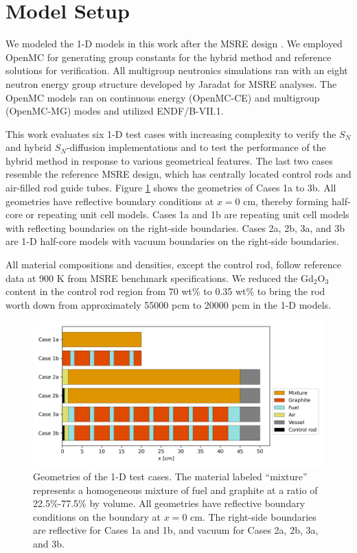 \documentclass[letterpaper]{mc2025}
\begin{document}
\section{Model Setup}

We modeled the 1-D models in this work after the \gls*{MSRE} design \cite{robertson_msre_1965}. We
employed OpenMC \cite{romano_openmc:_2015} for generating group constants
for the hybrid method and reference solutions for verification. All multigroup
neutronics simulations ran with an eight neutron energy group structure developed by Jaradat
\cite{jaradat_development_2021-1} for \gls*{MSRE} analyses. The OpenMC models ran on continuous
energy (OpenMC-CE) and multigroup (OpenMC-MG) modes and utilized ENDF/B-VII.1.

This work evaluates six 1-D test cases with increasing complexity to verify the $S_N$ and hybrid
$S_N$-diffusion implementations and to test the performance of the hybrid
method in response to various geometrical features. The last two cases resemble the
reference \gls*{MSRE} design, which has centrally located control rods
and air-filled rod guide tubes. Figure \ref{fig:case-geom} shows the geometries of Cases 1a to
3b. All geometries have reflective boundary conditions at $x=0$ cm, thereby
forming half-core or repeating unit cell models. Cases 1a and 1b are repeating unit
cell models with reflecting boundaries on the right-side boundaries. Cases 2a, 2b, 3a, and 3b
are 1-D half-core models with vacuum boundaries on the right-side boundaries.

All material compositions and densities, except the control rod, follow
reference data at 900 K from \gls*{MSRE} benchmark specifications.
We reduced the Gd$_2$O$_3$ content in the control rod region from 70 wt\% to 0.35 wt\% to bring the
rod worth down from approximately 55000 pcm to 20000 pcm in the 1-D models.
%
\begin{figure}[htb!]
  \centering
  \includegraphics[width=0.75\columnwidth]{case-geometry}
  \caption{Geometries of the 1-D test cases. The material labeled ``mixture'' represents a
    homogeneous mixture of fuel and graphite at a ratio of 22.5\%-77.5\% by volume. All geometries
    have reflective boundary conditions on the boundary at $x=0$ cm. The right-side boundaries are
    reflective for Cases 1a and 1b, and vacuum for Cases 2a, 2b, 3a, and 3b.}
  \label{fig:case-geom}
\end{figure}
\end{document}
